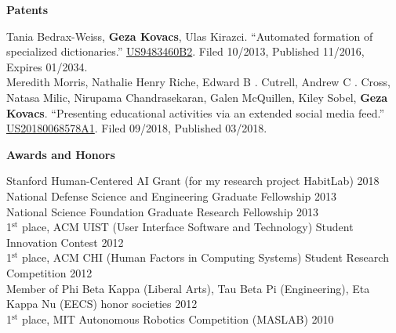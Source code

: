 \documentclass[10pt,A4]{article}
\newcommand{\cvsection}[1]
{
	\begin{center}
		\large\textcolor{sectcol}{\textbf{#1}}
	\end{center}
}
\begin{document}
\pagebreak

\cvsection{Patents}

Tania Bedrax-Weiss, \textbf{Geza Kovacs}, Ulas Kirazci. ``Automated formation of specialized dictionaries.'' \href{https://patents.google.com/patent/US9483460B2}{US9483460B2}. Filed 10/2013, Published 11/2016, Expires 01/2034.\\

Meredith Morris, Nathalie Henry Riche, Edward B . Cutrell, Andrew C . Cross, Natasa Milic, Nirupama Chandrasekaran, Galen McQuillen, Kiley Sobel, \textbf{Geza Kovacs}. ``Presenting educational activities via an extended social media feed.'' \href{https://patents.google.com/patent/US20180068578A1}{US20180068578A1}. Filed 09/2018, Published 03/2018.\\

\cvsection{Awards and Honors}

Stanford Human-Centered AI Grant (for my research project HabitLab) \hfill \textcolor{sectcol}{2018}\\ %
National Defense Science and Engineering Graduate Fellowship \hfill \textcolor{sectcol}{2013}\\ %
National Science Foundation Graduate Research Fellowship \hfill \textcolor{sectcol}{2013}\\ %
1$^{\textrm{st}}$ place, ACM UIST (User Interface Software and Technology) Student Innovation Contest \hfill \textcolor{sectcol}{2012}\\
1$^{\textrm{st}}$ place, ACM CHI (Human Factors in Computing Systems) Student Research Competition \hfill \textcolor{sectcol}{2012}\\
Member of Phi Beta Kappa (Liberal Arts), Tau Beta Pi (Engineering), Eta Kappa Nu (EECS) honor societies \hfill \textcolor{sectcol}{2012}\\
1$^{\textrm{st}}$ place, MIT Autonomous Robotics Competition (MASLAB) \hfill \textcolor{sectcol}{2010}\\
\end{document}
